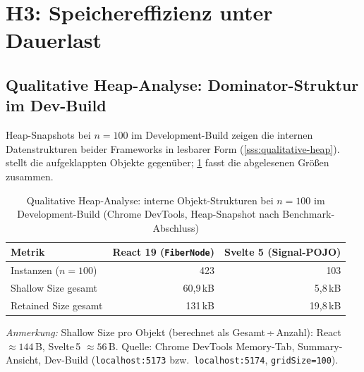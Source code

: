 \section{H3: Speichereffizienz unter Dauerlast}
\label{s:results-h3}

\subsection{Qualitative Heap-Analyse: Dominator-Struktur im Dev-Build}
\label{ss:results-h3-qualitative}

Heap-Snapshots bei $n = 100$ im Development-Build zeigen die internen Datenstrukturen beider Frameworks in lesbarer Form (\cref{sss:qualitative-heap}).  stellt die aufgeklappten Objekte gegenüber; \cref{tab:heap-qualitative} fasst die abgelesenen Größen zusammen.
\begin{table}[htbp]
  \centering
  \caption[Qualitative Heap-Analyse: interne Objekt-Strukturen ($n = 100$, Dev-Build)]{Qualitative Heap-Analyse: interne Objekt-Strukturen bei $n = 100$
           im Development-Build (Chrome DevTools, Heap-Snapshot nach
           Benchmark-Abschluss)}
  \label{tab:heap-qualitative}
  \small
  \begin{tabular}{lrr}
    \toprule
    \textbf{Metrik}
      & \textbf{React 19} (\texttt{FiberNode})
      & \textbf{Svelte 5} (Signal-POJO) \\
    \midrule
    Instanzen ($n = 100$)  &  423      &  103      \\
    Shallow Size gesamt    & 60{,}9\,kB &  5{,}8\,kB \\
    Retained Size gesamt   & 131\,kB   & 19{,}8\,kB \\
    \bottomrule
  \end{tabular}
  \par\smallskip
  \raggedright\footnotesize
  \textit{Anmerkung:} Shallow Size pro Objekt (berechnet als Gesamt\,÷\,Anzahl):
  React $\approx 144$\,B, Svelte\,5 $\approx 56$\,B.
  Quelle: Chrome DevTools Memory-Tab, Summary-Ansicht, Dev-Build
  (\texttt{localhost:5173} bzw.\ \texttt{localhost:5174}, \texttt{gridSize=100}).
\end{table}
